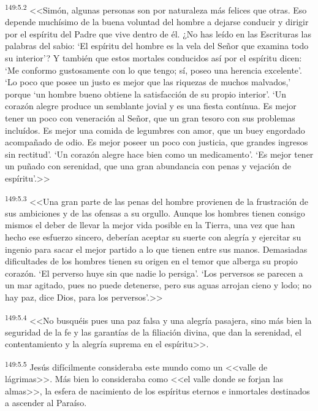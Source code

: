 \par 
\textsuperscript{149:5.2} <<Simón, algunas personas son por naturaleza más felices que otras. Eso depende muchísimo de la buena voluntad del hombre a dejarse conducir y dirigir por el espíritu del Padre que vive dentro de él. ¿No has leído en las Escrituras las palabras del sabio: `El espíritu del hombre es la vela del Señor que examina todo su interior'? Y también que estos mortales conducidos así por el espíritu dicen: `Me conformo gustosamente con lo que tengo; sí, poseo una herencia excelente'. `Lo poco que posee un justo es mejor que las riquezas de muchos malvados,' porque `un hombre bueno obtiene la satisfacción de su propio interior'. `Un corazón alegre produce un semblante jovial y es una fiesta contínua. Es mejor tener un poco con veneración al Señor, que un gran tesoro con sus problemas incluídos. Es mejor una comida de legumbres con amor, que un buey engordado acompañado de odio. Es mejor poseer un poco con justicia, que grandes ingresos sin rectitud'. `Un corazón alegre hace bien como un medicamento'. `Es mejor tener un puñado con serenidad, que una gran abundancia con penas y vejación de espíritu'.>>

\par 
\textsuperscript{149:5.3} <<Una gran parte de las penas del hombre provienen de la frustración de sus ambiciones y de las ofensas a su orgullo. Aunque los hombres tienen consigo mismos el deber de llevar la mejor vida posible en la Tierra, una vez que han hecho ese esfuerzo sincero, deberían aceptar su suerte con alegría y ejercitar su ingenio para sacar el mejor partido a lo que tienen entre sus manos. Demasiadas dificultades de los hombres tienen su origen en el temor que alberga su propio corazón. `El perverso huye sin que nadie lo persiga'. `Los perversos se parecen a un mar agitado, pues no puede detenerse, pero sus aguas arrojan cieno y lodo; no hay paz, dice Dios, para los perversos'.>>

\par 
\textsuperscript{149:5.4} <<No busquéis pues una paz falsa y una alegría pasajera, sino más bien la seguridad de la fe y las garantías de la filiación divina, que dan la serenidad, el contentamiento y la alegría suprema en el espíritu>>.

\par 
\textsuperscript{149:5.5} Jesús difícilmente consideraba este mundo como un <<valle de lágrimas>>. Más bien lo consideraba como <<el valle donde se forjan las almas>>, la esfera de nacimiento de los espíritus eternos e inmortales destinados a ascender al Paraíso.

